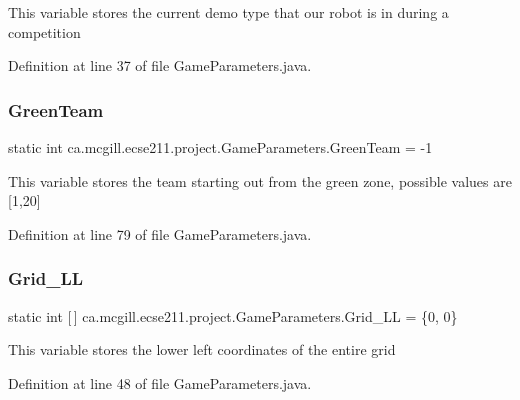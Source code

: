 This variable stores the current demo type that our robot is in during a competition 

Definition at line 37 of file Game\+Parameters.\+java.

\mbox{\label{enumca_1_1mcgill_1_1ecse211_1_1project_1_1_game_parameters_a1d6292807667d219edc172574c2aedbc}} 
\subsubsection{\texorpdfstring{Green\+Team}{GreenTeam}}
{\footnotesize\ttfamily  static  int ca.\+mcgill.\+ecse211.\+project.\+Game\+Parameters.\+Green\+Team = -\/1\hspace{0.3cm}{\ttfamily [static]}}

This variable stores the team starting out from the green zone, possible values are \mbox{[}1,20\mbox{]} 

Definition at line 79 of file Game\+Parameters.\+java.

\mbox{\label{enumca_1_1mcgill_1_1ecse211_1_1project_1_1_game_parameters_ab190471dbd9bb10d8cef92c1b8bea826}} 
\subsubsection{\texorpdfstring{Grid\+\_\+\+LL}{Grid\_LL}}
{\footnotesize\ttfamily  static  int \mbox{[}$\,$\mbox{]} ca.\+mcgill.\+ecse211.\+project.\+Game\+Parameters.\+Grid\+\_\+\+LL = \{0, 0\}\hspace{0.3cm}{\ttfamily [static]}}

This variable stores the lower left coordinates of the entire grid 

Definition at line 48 of file Game\+Parameters.\+java.

